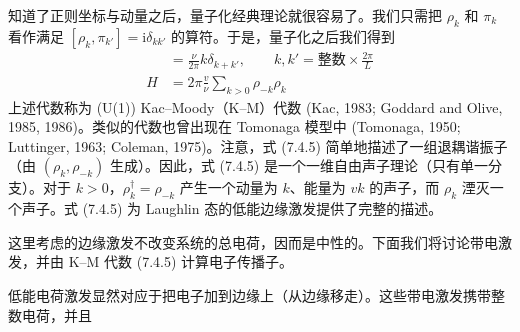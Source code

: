 知道了正则坐标与动量之后，量子化经典理论就很容易了。我们只需把 $\rho_{k}$ 和 $\pi_{k}$ 看作满足 $[\rho_{k},\pi_{k'}]=\mathrm{i}\delta_{kk'}$ 的算符。于是，量子化之后我们得到
\begin{align*}
[\rho_{k},\rho_{k'}]&=\frac{\nu}{2\pi}k\delta_{k+k'},\qquad
k,k'=\text{整数}\times\frac{2\pi}{L} \tag{7.4.5}\\
H&=2\pi\frac{v}{\nu}\sum_{k>0}\rho_{-k}\rho_{k}
\end{align*}
上述代数称为 (U(1)) Kac--Moody（K--M）代数 (Kac, 1983; Goddard and Olive, 1985, 1986)。类似的代数也曾出现在 Tomonaga 模型中 (Tomonaga, 1950; Luttinger, 1963; Coleman, 1975)。注意，式 (7.4.5) 简单地描述了一组退耦谐振子（由 $(\rho_{k},\rho_{-k})$ 生成）。因此，式 (7.4.5) 是一个一维自由声子理论（只有单一分支）。对于 $k>0$，$\rho_{k}^{\dagger}=\rho_{-k}$ 产生一个动量为 $k$、能量为 $vk$ 的声子，而 $\rho_{k}$ 湮灭一个声子。式 (7.4.5) 为 Laughlin 态的低能边缘激发提供了完整的描述。

这里考虑的边缘激发不改变系统的总电荷，因而是中性的。下面我们将讨论带电激发，并由 K--M 代数 (7.4.5) 计算电子传播子。

低能电荷激发显然对应于把电子加到边缘上（从边缘移走）。这些带电激发携带整数电荷，并且
